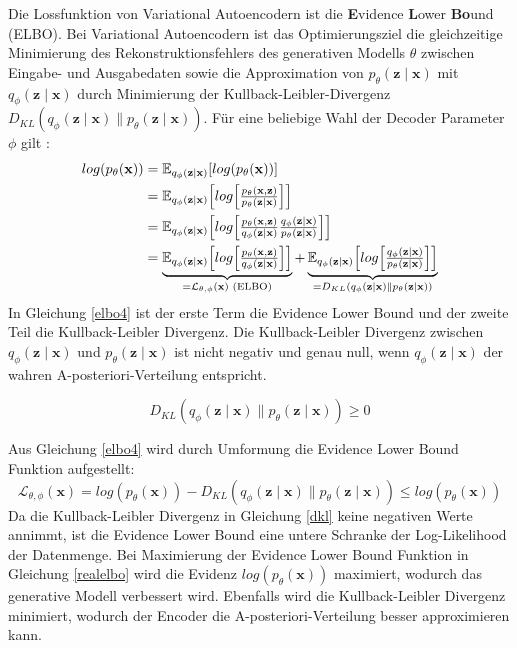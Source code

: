 \label{elbo}
Die Lossfunktion von Variational Autoencodern ist die \textbf{E}vidence \textbf{L}ower \textbf{Bo}und (ELBO).
Bei Variational Autoencodern ist das Optimierungsziel die gleichzeitige Minimierung des Rekonstruktionsfehlers des generativen Modells $\theta$ zwischen Eingabe- und Ausgabedaten sowie die Approximation von $p_\theta (\mathbf{z\mid x})$ mit $q_\phi (\mathbf{z\mid x})$ durch Minimierung der Kullback-Leibler-Divergenz $D_{KL}(q_\phi(\mathbf{z\mid x})\parallel p_\theta(\mathbf{z\mid x}))$.
Für eine beliebige Wahl der Decoder Parameter $\phi$ gilt \citep{introVAE}:
\begin{align}
    log(p_\theta(\mathbf{x})) &= \mathbb{E}_{ q_\phi(\mathbf{z\mid x}) } [log( p_\theta(\mathbf{x}) )] \nonumber \\
    &= \mathbb{E}_{q_\phi( \mathbf{z\mid x} )} \Bigl[ log \Bigl[ \tfrac{ p_\theta(\mathbf{x,z}) }{ p_\theta(\mathbf{z \mid x}) } \Bigr] \Bigr] \nonumber \\
    &= \mathbb{E}_{q_\phi( \mathbf{z\mid x} )} \Bigl[ log \Bigl[ \tfrac{ p_\theta(\mathbf{x,z}) }{ q_\phi( \mathbf{z\mid x} ) } \tfrac{ q_\phi( \mathbf{z\mid x} ) }{ p_\theta(\mathbf{z \mid x}) }\Bigr] \Bigr] \nonumber \\
    &= \underbrace{\mathbb{E}_{q_\phi( \mathbf{z\mid x} )} \Bigl[ log \Bigl[ \tfrac{ p_\theta(\mathbf{x,z}) }{ q_\phi( \mathbf{z\mid x} ) } \Bigr] \Bigr]}_{=\mathcal{L}_{\theta,\phi}(\mathbf{x}) \text{ (ELBO)}} + \underbrace{\mathbb{E}_{q_\phi( \mathbf{z\mid x} )} \Bigl[ log \Bigl[ \tfrac{ q_\phi( \mathbf{z\mid x} ) }{ p_\theta(\mathbf{z \mid x}) }\Bigr] \Bigr]}_{=D_{KL}(q_\phi(\mathbf{z\mid x})\parallel p_\theta(\mathbf{z\mid x}))} \label{elbo4}
\end{align}
In Gleichung \ref{elbo4} ist der erste Term die Evidence Lower Bound und der zweite Teil die Kullback-Leibler Divergenz.
Die Kullback-Leibler Divergenz zwischen $q_\phi(\mathbf{z\mid x})$ und $p_\theta(\mathbf{z\mid x})$ ist nicht negativ und genau null, wenn $q_\phi(\mathbf{z\mid x})$ der wahren A-posteriori-Verteilung entspricht.

\begin{equation}
    \label{dkl}
    D_{KL}(q_\phi(\mathbf{z\mid x})\parallel p_\theta(\mathbf{z\mid x})) \geq 0
\end{equation}

Aus Gleichung \ref{elbo4} wird durch Umformung die Evidence Lower Bound Funktion aufgestellt:
\begin{equation}
    \label{realelbo}
    \mathcal{L}_{\theta,\phi}(\mathbf{x}) = log(p_\theta(\mathbf{x})) - D_{KL}(q_\phi(\mathbf{z\mid x})\parallel p_\theta(\mathbf{z\mid x})) \leq log(p_\theta(\mathbf{x})) 
\end{equation}
Da die Kullback-Leibler Divergenz in Gleichung \ref{dkl} keine negativen Werte annimmt, ist die Evidence Lower Bound eine untere Schranke der Log-Likelihood der Datenmenge.
Bei Maximierung der Evidence Lower Bound Funktion in Gleichung \ref{realelbo} wird die Evidenz $log(p_\theta(\mathbf{x}))$ maximiert, wodurch das generative Modell verbessert wird. Ebenfalls wird die Kullback-Leibler Divergenz minimiert, wodurch der Encoder die A-posteriori-Verteilung besser approximieren kann.

